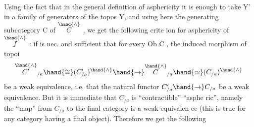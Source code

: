 Using the fact that in the  general definition of asphericity
it is enough to take Y' in a family of generators of the topos Y,  and 
using here the generating subcategory C of $\overset{\hand{\wedge}}{C}$ ,  we get the following crite
ion for asphericity of $\overset{\hand{\wedge}}{f}$ :  if is nec. and sufficient that for every
Ob C ,  the induced morphism of topoi
\[ \overset{\hand{\wedge}}{C'}_{/a} \hand{\cong} (C'_{/a})^{\hand{\wedge}} \hand{\to} \overset{\hand{\wedge}}{C}_{/a} \hand{\simeq} (C_{/a})^{\hand{\wedge}} \]
be a weak equivalence,  i.e. that the natural functor  $C'_{/a}\hand{\to} C_{/a}$ be a weak
equivalence.  But it is immediate that $C_{/a}$ is ``contractible''   ``asphe
ric'',  namely the ``map'' from $C_{/a}$ to the final category is a weak equivalen
ce (this is true for any category having a final object). Therefore we get
the following

